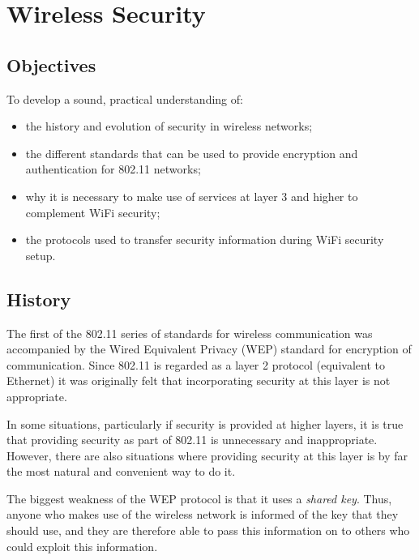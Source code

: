 \chapter{Wireless Security}\label{security}

\minitoc 

\clearpage
\section*{Objectives}
To develop a sound, practical understanding of:
\begin{itemize}

\item the history and evolution of security in wireless networks;

\item the different standards that can be used to provide encryption and authentication for 802.11 networks;

\item why it is necessary to make use of services at layer 3 and higher to complement WiFi security;

\item the protocols used to transfer security information during WiFi security setup.

\end{itemize}


\section{History}
The first of the 802.11 series of standards for wireless communication was accompanied
by the Wired Equivalent Privacy (WEP) standard for encryption of communication. Since
802.11 is regarded as a layer 2 protocol (equivalent to Ethernet) it was originally felt that incorporating security at this layer is not appropriate.

In some situations, particularly if security is provided at higher layers, it is true that providing security as part of 802.11 is unnecessary and inappropriate. However, there are also situations where providing security at this layer is by far the most natural and convenient way to do it.

The biggest weakness of the WEP protocol is that it uses a {\em shared key}. Thus, anyone who makes use of the wireless network is informed of the key that they should use, and they are therefore able to pass this information on to others who could exploit this information.

